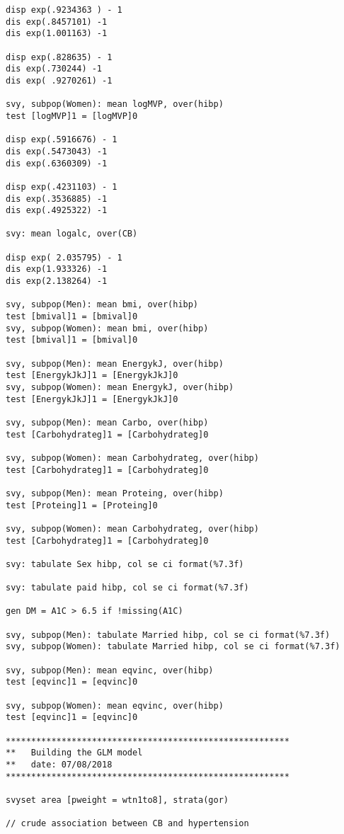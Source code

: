 \begin{verbatim}
disp exp(.9234363 ) - 1    
dis exp(.8457101) -1 
dis exp(1.001163) -1

disp exp(.828635) - 1    
dis exp(.730244) -1 
dis exp( .9270261) -1

svy, subpop(Women): mean logMVP, over(hibp) 
test [logMVP]1 = [logMVP]0

disp exp(.5916676) - 1    
dis exp(.5473043) -1 
dis exp(.6360309) -1

disp exp(.4231103) - 1    
dis exp(.3536885) -1 
dis exp(.4925322) -1

svy: mean logalc, over(CB)

disp exp( 2.035795) - 1    
dis exp(1.933326) -1 
dis exp(2.138264) -1

svy, subpop(Men): mean bmi, over(hibp)
test [bmival]1 = [bmival]0
svy, subpop(Women): mean bmi, over(hibp)
test [bmival]1 = [bmival]0

svy, subpop(Men): mean EnergykJ, over(hibp)
test [EnergykJkJ]1 = [EnergykJkJ]0
svy, subpop(Women): mean EnergykJ, over(hibp)
test [EnergykJkJ]1 = [EnergykJkJ]0

svy, subpop(Men): mean Carbo, over(hibp)
test [Carbohydrateg]1 = [Carbohydrateg]0

svy, subpop(Women): mean Carbohydrateg, over(hibp)
test [Carbohydrateg]1 = [Carbohydrateg]0

svy, subpop(Men): mean Proteing, over(hibp)
test [Proteing]1 = [Proteing]0

svy, subpop(Women): mean Carbohydrateg, over(hibp)
test [Carbohydrateg]1 = [Carbohydrateg]0

svy: tabulate Sex hibp, col se ci format(%7.3f)

svy: tabulate paid hibp, col se ci format(%7.3f)

gen DM = A1C > 6.5 if !missing(A1C)

svy, subpop(Men): tabulate Married hibp, col se ci format(%7.3f)
svy, subpop(Women): tabulate Married hibp, col se ci format(%7.3f)

svy, subpop(Men): mean eqvinc, over(hibp)
test [eqvinc]1 = [eqvinc]0

svy, subpop(Women): mean eqvinc, over(hibp)
test [eqvinc]1 = [eqvinc]0

********************************************************
**   Building the GLM model 
**   date: 07/08/2018
********************************************************

svyset area [pweight = wtn1to8], strata(gor)

// crude association between CB and hypertension 


\end{verbatim}
